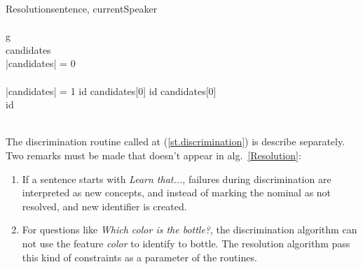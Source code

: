 \documentclass[a4paper]{article}
\begin{document}
\begin{pseudocode}[ruled]{Resolution}{sentence, currentSpeaker}
 \\
 \GETS {} \\

\FOREACH g \in {} \DO 
\BEGIN
    \GETS {} \\
   candidates \GETS {} \\
   
   \IF \left|{candidates}\right| = 0 \THEN
    \BEGIN
       \\
      \EXIT \\
    \END
   \ELSEIF \left|{candidates}\right| = 1 \THEN
      id \GETS candidates[0]
   \ELSE
      \BEGIN
        \IF {} \THEN
          id \GETS candidates[0] \\
        \ELSE
          id \GETS {} \\
      \END \\
\END
\ENDMAIN
\end{pseudocode}

The discrimination routine called at (\ref{st.discrimination}) is describe separately. 
Two remarks must be made that doesn't appear in alg.~\ref{Resolution}:
\begin{enumerate}
    \item If a sentence starts with {\it Learn that...}, failures during 
    discrimination are interpreted as new concepts, and instead of marking the 
    nominal as not resolved, and new identifier is created.
    \item For questions like {\it Which color is the bottle?}, the discrimination 
    algorithm can not use the feature {\it color} to identify to bottle. The 
    resolution algorithm pass this kind of constraints as a parameter of the 
     routines.
\end{enumerate}
\end{document}
